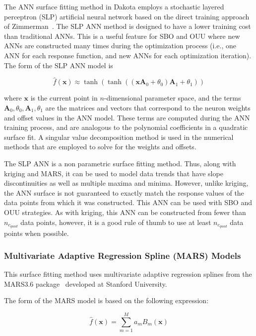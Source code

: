 The ANN surface fitting method in Dakota employs a stochastic layered
perceptron (SLP) artificial neural network based on the direct
training approach of Zimmerman~\cite{Zim96}. The SLP ANN method is
designed to have a lower training cost than traditional ANNs. This is
a useful feature for SBO and OUU where new ANNs are constructed many
times during the optimization process (i.e., one ANN for each response
function, and new ANNs for each optimization iteration). The form of
the SLP ANN model is

\begin{equation}
  \hat{f}(\mathbf{x}) \approx
  \tanh(\tanh((\mathbf{x A}_{0}+\theta_{0})\mathbf{A}_{1}+\theta_{1}))
  \label{models:surf:equation09}
\end{equation}

where $\mathbf{x}$ is the current point in $n$-dimensional parameter
space, and the terms
$\mathbf{A}_{0},\theta_{0},\mathbf{A}_{1},\theta_{1}$ are the matrices
and vectors that correspond to the neuron weights and offset values in
the ANN model. These terms are computed during the ANN training
process, and are analogous to the polynomial coefficients in a
quadratic surface fit. A singular value decomposition method is used
in the numerical methods that are employed to solve for the weights
and offsets.

The SLP ANN is a non parametric surface fitting method. Thus, along
with kriging and MARS, it can be used to model data trends that have
slope discontinuities as well as multiple maxima and minima. However,
unlike kriging, the ANN surface is not guaranteed to exactly match the
response values of the data points from which it was constructed. This
ANN can be used with SBO and OUU strategies. As with kriging, this ANN
can be constructed from fewer than $n_{c_{quad}}$ data points,
however, it is a good rule of thumb to use at least $n_{c_{quad}}$
data points when possible.

\subsubsection{Multivariate Adaptive Regression Spline (MARS) Models}\label{models:surf:mars}

This surface fitting method uses multivariate adaptive regression
splines from the MARS3.6 package~\cite{Fri91} developed at Stanford
University. 

The form of the MARS model is based on the following expression:

\begin{equation}
  \hat{f}(\mathbf{x})=\sum_{m=1}^{M}a_{m}B_{m}(\mathbf{x})
  \label{models:surf:equation10}  
\end{equation}

